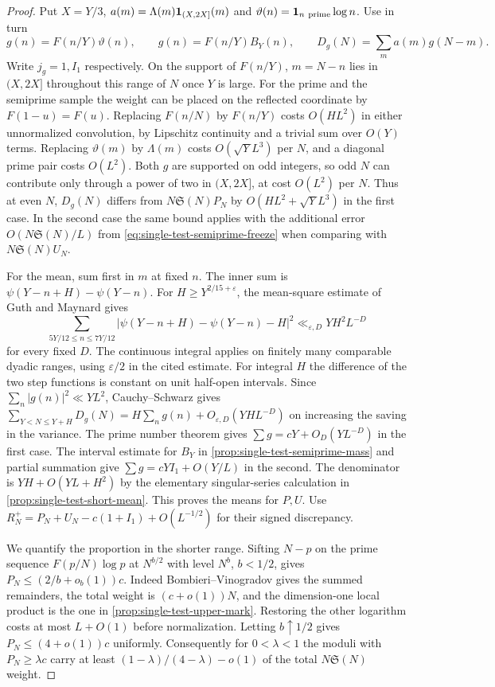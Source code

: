 \documentclass[11pt,a4paper]{article}
\numberwithin{equation}{section}
\newcommand{\SSS}{\mathfrak S}
\begin{document}
\begin{proof}
Put $X=Y/3$, $a(m)=\Lambda(m){\bf1}_{(X,2X]}(m)$ and
$\vartheta(n)={\bf1}_{n\ {\rm prime}}\log n$. Use in turn
\[
 g(n)=F(n/Y)\vartheta(n),\qquad g(n)=F(n/Y)B_Y(n),
 \qquad D_g(N)=\sum_m a(m)g(N-m).
\]
Write $j_g=1,I_1$ respectively. On the support of $F(n/Y)$,
$m=N-n$ lies in $(X,2X]$ throughout this range of $N$ once $Y$
is large. For the prime and the semiprime sample the weight can
be placed on the reflected coordinate by $F(1-u)=F(u)$.
Replacing $F(n/N)$ by $F(n/Y)$ costs $O(HL^2)$ in either
unnormalized convolution, by Lipschitz continuity and a trivial
sum over $O(Y)$ terms. Replacing $\vartheta(m)$ by $\Lambda(m)$
costs $O(\sqrt Y L^3)$ per $N$, and a diagonal prime pair costs
$O(L^2)$. Both $g$ are supported on odd integers, so odd $N$
can contribute only through a power of two in $(X,2X]$, at
cost $O(L^2)$ per $N$. Thus at even $N$, $D_g(N)$ differs from
$N\SSS(N)P_N$ by $O(HL^2+\sqrt Y L^3)$ in the first case.
In the second case the same bound applies with the additional
error $O(N\SSS(N)/L)$ from \eqref{eq:single-test-semiprime-freeze}
when comparing with $N\SSS(N)U_N$.

For the mean, sum first in $m$ at fixed $n$. The inner sum is
$\psi(Y-n+H)-\psi(Y-n)$. For $H\ge Y^{2/15+\varepsilon}$,
the mean-square estimate of Guth and Maynard
\cite[proof of Corollary~1.4, Section~13.2]{GuthMaynard} gives
\[
 \sum_{5Y/12\le n\le7Y/12}
 \big|\psi(Y-n+H)-\psi(Y-n)-H\big|^2
       \ll_{\varepsilon,D} YH^2 L^{-D}
\]
for every fixed $D$. The continuous integral applies on finitely
many comparable dyadic ranges, using $\varepsilon/2$ in the
cited estimate. For integral $H$ the difference of the two
step functions is constant on unit half-open intervals.
Since $\sum_n|g(n)|^2\ll YL^2$, Cauchy--Schwarz gives
$\sum_{Y<N\le Y+H}D_g(N)=H\sum_n g(n)+O_{\varepsilon,D}(YHL^{-D})$
on increasing the saving in the variance. The prime number theorem
gives $\sum g=cY+O_D(YL^{-D})$ in the first case.
The interval estimate for $B_Y$ in \cref{prop:single-test-semiprime-mass}
and partial summation give $\sum g=cYI_1+O(Y/L)$ in the second.
The denominator is $YH+O(YL+H^2)$ by the elementary singular-series
calculation in \cref{prop:single-test-short-mean}.
This proves the means for $P,U$. Use
$R_N^+=P_N+U_N-c(1+I_1)+O(L^{-1/2})$ for their signed discrepancy.

We quantify the proportion in the shorter range. Sifting $N-p$
on the prime sequence $F(p/N)\log p$ at $N^{b/2}$ with level
$N^b$, $b<1/2$, gives $P_N\le(2/b+o_b(1))c$. Indeed
Bombieri--Vinogradov gives the summed remainders, the total
weight is $(c+o(1))N$, and the dimension-one local product is
the one in \cref{prop:single-test-upper-mark}. Restoring the
other logarithm costs at most $L+O(1)$ before normalization.
Letting $b\uparrow1/2$ gives $P_N\le(4+o(1))c$ uniformly.
Consequently for $0<\lambda<1$ the moduli with $P_N\ge\lambda c$
carry at least $(1-\lambda)/(4-\lambda)-o(1)$ of the total
$N\SSS(N)$ weight.


\end{proof}
\end{document}
